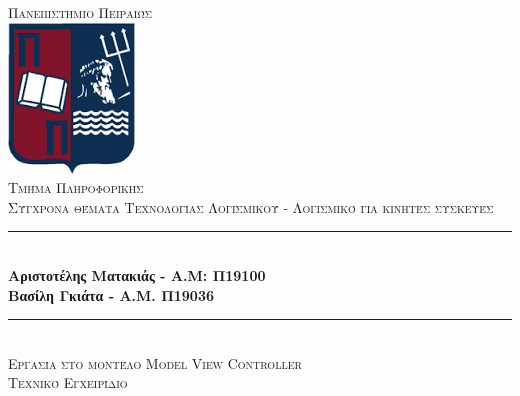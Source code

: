 \documentclass[12pt]{article}
\begin{document}
	
	\begin{titlepage}
		
		\newcommand{\HRule}{\rule{\linewidth}{0.5mm}} %
		
		\center %
		
		
		\textsc{\LARGE Πανεπιστήμιο Πειραιώς}\\[1.5cm] %
		\includegraphics[scale=0.6]{UNIPI_(logo).png}\\[1cm] %
		\textsc{\Large Τμήμα Πληροφορικής}\\[0.5cm] %
		\textsc{\large Σύγχρονα θέματα Τεχνολογίας Λογισμικού - Λογισμικό για κινητές συσκευές}\\[0.5cm] %
		
		
		\HRule \\[0.4cm]
		{ \Large \bfseries Αριστοτέλης Ματακιάς - Α.Μ: Π19100}\\[0.4cm] %
		{ \Large \bfseries Βασίλη Γκιάτα - Α.Μ. Π19036}\\[0.4cm] %
		\HRule \\[1.5cm]
		
		
		\textsc{\Large Εργασία στο μοντέλο Model View Controller \\[0.4cm] Τεχνικό Εγχειρίδιο} %
		

\end{titlepage}
\end{document}
